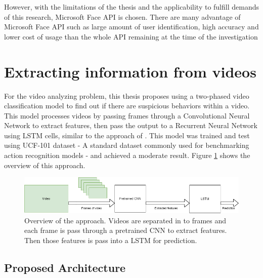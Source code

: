 However, with the limitations of the thesis and the applicability to fulfill demands of this research, Microsoft Face API is chosen. There are many advantage of Microsoft Face API such as large amount of user identification, high accuracy and lower cost of usage than the whole API remaining at the time of the investigation


\section{Extracting information from videos}
For the video analyzing problem, this thesis proposes using a two-phased video classification model to find out if there are suspicious behaviors within a video. This model processes videos by passing frames through a Convolutional Neural Network to extract features, then pass the output to a Recurrent Neural Network using LSTM cells, similar to the approach of \cite{DBLP:journals/corr/DonahueHGRVSD14}. This model was trained and test using UCF-101 dataset - A standard dataset commonly used for benchmarking action recognition models - and achieved a moderate result. Figure \ref{chap3:model_architecture} shows the overview of this approach.
\begin{center}
	\begin{figure}[H]
		\centering
		\includegraphics[width=1\columnwidth]{images/chap3/model_architecture.png}
		\caption{Overview of the approach. Videos are separated in to frames and each frame is pass through a pretrained CNN to extract features. Then those features is pass into a LSTM for prediction.}
		\label{chap3:model_architecture}
	\end{figure}
\end{center}
\vspace{-1cm}
\subsection{Proposed Architecture}
